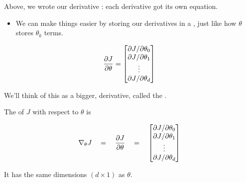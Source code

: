         Above, we wrote our derivative : each derivative got its own equation.

        \begin{itemize}
            \item We can make things easier by storing our derivatives in a , just like how $\theta$ stores $\theta_k$ terms.
        \end{itemize}

        \begin{equation}
            \frac{\partial J}{\partial \theta} = 
            \begin{bmatrix}
                {\partial J}/{\partial \theta_0}\\
                {\partial J}/{\partial \theta_1}\\
                \vdots \\
                {\partial J}/{\partial \theta_d}\\
            \end{bmatrix}
        \end{equation}

        We'll think of this as a bigger,  derivative, called the .
            \\
        
        \begin{kequation}
            The  of $J$ with respect to $\theta$ is
            
            \begin{equation*}
                \nabla_\theta J 
                \quad=\quad
                \frac{\partial J}{\partial \theta} 
                \quad=\quad
                \begin{bmatrix}
                    {\partial J}/{\partial \theta_0} \\
                    {\partial J}/{\partial \theta_1} \\
                    \vdots \\
                    {\partial J}/{\partial \theta_d}
                \end{bmatrix}
            \end{equation*}

            It has the same dimensions $(d \times 1)$ as $\theta$.
        \end{kequation}

